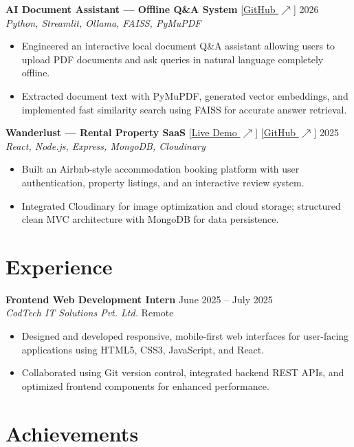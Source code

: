 \documentclass[10pt,a4paper]{article}
\newcommand{\resumeSubheading}[4]{%
    \par\vspace{3pt}%
    \textbf{\color{primary}#1} \hfill {\small\color{textgray}#2}\\
    \textit{\color{textgray}#3} \hfill {\small\color{textgray}#4}\par\vspace{2pt}%
}
\newcommand{\resumeProject}[4]{%
    \par\vspace{4pt}%
    \textbf{\color{primary}#1} \hspace{4pt} {\footnotesize\color{accent}#2} \hfill {\small\color{textgray}#3}\\
    \textit{\footnotesize\color{textgray}#4}\par\vspace{2pt}%
}
\begin{document}
\resumeProject
{AI Document Assistant --- Offline Q\&A System}
{[\href{https://github.com/HarshitMangal/AI-Document-Chatbot}{GitHub $\nearrow$}]}
{2026}
{Python, Streamlit, Ollama, FAISS, PyMuPDF}
\begin{itemize}
    \item Engineered an interactive local document Q\&A assistant allowing users to upload PDF documents and ask queries in natural language completely offline.
    \item Extracted document text with PyMuPDF, generated vector embeddings, and implemented fast similarity search using FAISS for accurate answer retrieval.
\end{itemize}

\resumeProject
{Wanderlust --- Rental Property SaaS}
{[\href{https://major-project-wht3.onrender.com}{Live Demo $\nearrow$}] [\href{https://github.com/HarshitMangal/major_project}{GitHub $\nearrow$}]}
{2025}
{React, Node.js, Express, MongoDB, Cloudinary}
\begin{itemize}
    \item Built an Airbnb-style accommodation booking platform with user authentication, property listings, and an interactive review system.
    \item Integrated Cloudinary for image optimization and cloud storage; structured clean MVC architecture with MongoDB for data persistence.
\end{itemize}

\section*{Experience}

\resumeSubheading
{Frontend Web Development Intern}{June 2025 -- July 2025}
{CodTech IT Solutions Pvt. Ltd.}{Remote}
\begin{itemize}
    \item Designed and developed responsive, mobile-first web interfaces for user-facing applications using HTML5, CSS3, JavaScript, and React.
    \item Collaborated using Git version control, integrated backend REST APIs, and optimized frontend components for enhanced performance.
\end{itemize}

\section*{Achievements}
\end{document}
